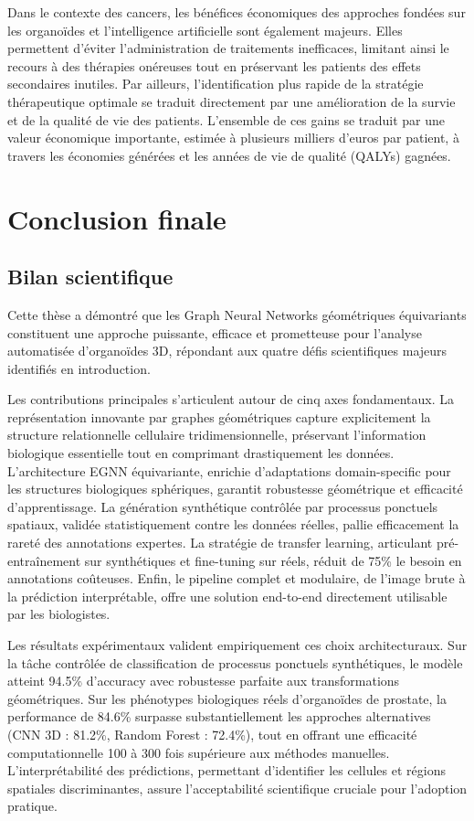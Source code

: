 Dans le contexte des cancers, les bénéfices économiques des approches fondées sur les organoïdes et l’intelligence artificielle sont également majeurs. Elles permettent d’éviter l’administration de traitements inefficaces, limitant ainsi le recours à des thérapies onéreuses tout en préservant les patients des effets secondaires inutiles. Par ailleurs, l’identification plus rapide de la stratégie thérapeutique optimale se traduit directement par une amélioration de la survie et de la qualité de vie des patients. L’ensemble de ces gains se traduit par une valeur économique importante, estimée à plusieurs milliers d’euros par patient, à travers les économies générées et les années de vie de qualité (QALYs) gagnées.

\section{Conclusion finale}

\subsection{Bilan scientifique}

Cette thèse a démontré que les Graph Neural Networks géométriques équivariants constituent une approche puissante, efficace et prometteuse pour l'analyse automatisée d'organoïdes 3D, répondant aux quatre défis scientifiques majeurs identifiés en introduction.

Les contributions principales s'articulent autour de cinq axes fondamentaux. La représentation innovante par graphes géométriques capture explicitement la structure relationnelle cellulaire tridimensionnelle, préservant l'information biologique essentielle tout en comprimant drastiquement les données. L'architecture EGNN équivariante, enrichie d'adaptations domain-specific pour les structures biologiques sphériques, garantit robustesse géométrique et efficacité d'apprentissage. La génération synthétique contrôlée par processus ponctuels spatiaux, validée statistiquement contre les données réelles, pallie efficacement la rareté des annotations expertes. La stratégie de transfer learning, articulant pré-entraînement sur synthétiques et fine-tuning sur réels, réduit de 75\% le besoin en annotations coûteuses. Enfin, le pipeline complet et modulaire, de l'image brute à la prédiction interprétable, offre une solution end-to-end directement utilisable par les biologistes.

Les résultats expérimentaux valident empiriquement ces choix architecturaux. Sur la tâche contrôlée de classification de processus ponctuels synthétiques, le modèle atteint 94.5\% d'accuracy avec robustesse parfaite aux transformations géométriques. Sur les phénotypes biologiques réels d'organoïdes de prostate, la performance de 84.6\% surpasse substantiellement les approches alternatives (CNN 3D : 81.2\%, Random Forest : 72.4\%), tout en offrant une efficacité computationnelle 100 à 300 fois supérieure aux méthodes manuelles. L'interprétabilité des prédictions, permettant d'identifier les cellules et régions spatiales discriminantes, assure l'acceptabilité scientifique cruciale pour l'adoption pratique.

